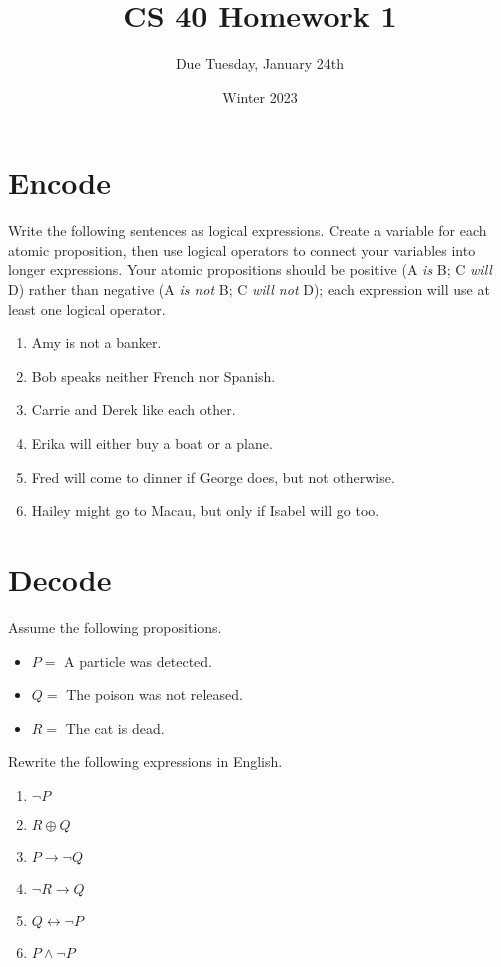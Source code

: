 \documentclass{article}
\title{CS 40 Homework 1}
\author{Due Tuesday, January 24th}
\date{Winter 2023}
\begin{document}
\maketitle

\section{Encode}

Write the following sentences as logical expressions.
Create a variable for each atomic proposition, then use logical operators to connect your variables into longer expressions.
Your atomic propositions should be positive (A \textit{is} B; C \textit{will} D) rather than negative (A \textit{is not} B; C \textit{will not} D); each expression will use at least one logical operator.

\begin{enumerate}[label=\textbf{\alph*.}]
    \item Amy is not a banker.
    \item Bob speaks neither French nor Spanish.
    \item Carrie and Derek like each other.
    \item Erika will either buy a boat or a plane.
    \item Fred will come to dinner if George does, but not otherwise.
    \item Hailey might go to Macau, but only if Isabel will go too.
\end{enumerate}


\section{Decode}

Assume the following propositions.

\begin{itemize}
    \setlength{\itemsep}{0pt}
    \item $P = $ A particle was detected.
    \item $Q = $ The poison was not released.
    \item $R = $ The cat is dead.
\end{itemize}

\noindent
Rewrite the following expressions in English.

\begin{enumerate}[label=\textbf{\alph*.}]
    \item $\neg P$
    \item $R \oplus Q$
    \item $P \rightarrow \neg Q$
    \item $\neg R \rightarrow Q$
    \item $Q \leftrightarrow \neg P$
    \item $P \wedge \neg P$
\end{enumerate}
\end{document}
